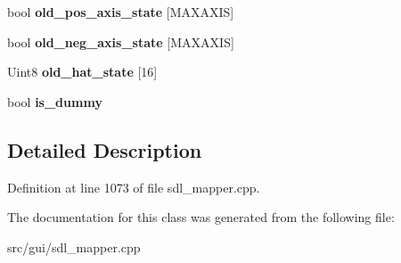 \begin{DoxyCompactItemize}
\item 
\hypertarget{classCStickBindGroup_a283b8cbb49f54ad309ac461d31fcb8f3}{bool {\bfseries old\-\_\-pos\-\_\-axis\-\_\-state} \mbox{[}M\-A\-X\-A\-X\-I\-S\mbox{]}}\label{classCStickBindGroup_a283b8cbb49f54ad309ac461d31fcb8f3}

\item 
\hypertarget{classCStickBindGroup_abf4f7de4055e1e6a70016a6830a39128}{bool {\bfseries old\-\_\-neg\-\_\-axis\-\_\-state} \mbox{[}M\-A\-X\-A\-X\-I\-S\mbox{]}}\label{classCStickBindGroup_abf4f7de4055e1e6a70016a6830a39128}

\item 
\hypertarget{classCStickBindGroup_a19df3fcb72315b312752da5a66676dc3}{Uint8 {\bfseries old\-\_\-hat\-\_\-state} \mbox{[}16\mbox{]}}\label{classCStickBindGroup_a19df3fcb72315b312752da5a66676dc3}

\item 
\hypertarget{classCStickBindGroup_a23c7e557c5ce9b73c62321e8c1504abc}{bool {\bfseries is\-\_\-dummy}}\label{classCStickBindGroup_a23c7e557c5ce9b73c62321e8c1504abc}

\end{DoxyCompactItemize}


\subsection{Detailed Description}


Definition at line 1073 of file sdl\-\_\-mapper.\-cpp.



The documentation for this class was generated from the following file\-:\begin{DoxyCompactItemize}
\item 
src/gui/sdl\-\_\-mapper.\-cpp\end{DoxyCompactItemize}
